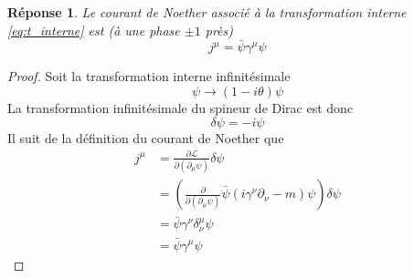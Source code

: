 \documentclass{article}
\numberwithin{equation}{section}
\theoremstyle{solution}
\newtheorem{solution}{Réponse}[section]
\begin{document}
\begin{solution}
Le courant de Noether associé à la transformation interne \eqref{eq:t_interne} est (à une phase $\pm 1$ près)
\begin{equation}
        \boxed{j^{\mu} = \bar{\psi} \gamma^{\mu} \psi}
\end{equation} 
\end{solution}
\begin{proof}
Soit la transformation interne infinitésimale
\begin{equation}
        \psi \rightarrow  (1 - i \theta) \psi
\end{equation} 
La transformation infinitésimale du spineur de Dirac est donc 
\begin{equation}
        \delta \psi = -i \psi
\end{equation} 
Il suit de la définition du courant de Noether que
\begin{align*}
        j^{\mu} &= \frac{\partial \mathcal{L}}{\partial (\partial_{\mu} \psi)} \delta \psi \\
        &= \left(  \frac{\partial }{\partial (\partial_{\mu}\psi)} \bar{\psi}(i \gamma^{\nu} \partial_\nu - m) \psi\right) \delta\psi\\
        &= \bar{\psi}\gamma^{\nu} \delta^{\mu}_\nu \psi \\
        &= \bar{\psi}\gamma^{\mu}\psi
\end{align*} 
\end{proof}
\end{document}
